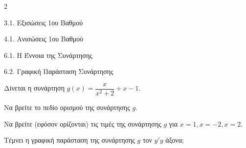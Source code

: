 \begin{ylh}{2}
    \item 3.1. Εξισώσεις 1ου Βαθμού
    \item 4.1. Ανισώσεις 1ου Βαθμού
    \item 6.1. Η Έννοια της Συνάρτησης
    \item 6.2. Γραφική Παράσταση Συνάρτησης
\end{ylh}
Δίνεται η συνάρτηση $g(x) = \dfrac{x}{x^2+2} + x - 1$.
\begin{alist}
\item Να βρείτε το πεδίο ορισμού της συνάρτησης $g$.
\item Να βρείτε (εφόσον ορίζονται) τις τιμές της συνάρτησης $g$ για $x=1, x=-2, x=2$.
\item Τέμνει η γραφική παράσταση της συνάρτησης $g$ τον $y'y$ άξονα;
\end{alist}

